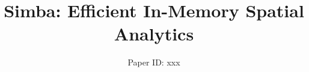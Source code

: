 \documentclass{sig-alternate}
\newcommand{\name}{Simba\xspace}
\begin{document}
\title{\name: Efficient In-Memory Spatial Analytics}

\author{Paper ID: xxx}

\maketitle

\thispagestyle{empty}
\begin{abstract}

\end{abstract}
%
%











\small


\normalsize

\end{document}
